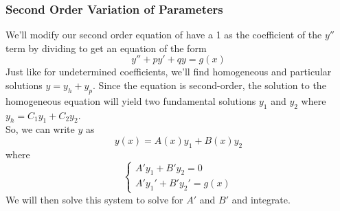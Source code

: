 \subsubsection{Second Order Variation of Parameters}
\noindent
We'll modify our second order equation of have a 1 as the coefficient of the $y''$ term by dividing to get an equation of the form
\begin{equation*}
	y'' + py' + qy = g(x)
\end{equation*}
Just like for undetermined coefficients, we'll find homogeneous and particular solutions $y = y_h + y_p$. Since the equation is second-order, the solution to the homogeneous equation will yield two fundamental solutions $y_1$ and $y_2$ where $y_h = C_1y_1 + C_2y_2$.\\

\noindent
So, we can write $y$ as
\begin{equation*}
	y(x) = A(x)y_1 + B(x)y_2
\end{equation*}
where
\begin{equation*}
	\begin{cases}
		A'y_1  + B'y_2  = 0 \\
		A'y_1' + B'y_2' = g(x)
	\end{cases}
\end{equation*}
We will then solve this system to solve for $A'$ and $B'$ and integrate.

